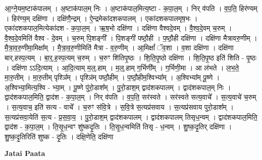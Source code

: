 \documentclass[17pt]{extarticle}
\begin{document}
आ॒ग्ने॒यम॒ष्टाक॑पालम् । अ॒ष्टाक॑पाल॒म् निः । अ॒ष्टाक॑पाल॒मित्य॒ष्टा - क॒पा॒ल॒म् । निर् व॑पति । व॒प॒ति॒ हिर॑ण्यम् । हिर॑ण्य॒म् दक्षि॑णा । दक्षि॑णै॒न्द्रम् । ऐ॒न्द्रमेका॑दशकपालम् । एका॑दशकपालमृष॒भः । एका॑दशकपाल॒मित्येका॑दश - क॒पा॒ल॒म् । ऋ॒ष॒भो दक्षि॑णा । दक्षि॑णा वैश्वदे॒वम् । वै॒श्व॒दे॒वम् च॒रुम् । वै॒श्व॒दे॒वमिति॑ वैश्व - दे॒वम् । च॒रुम् पि॒शङ्गी᳚ । पि॒शङ्गी॑ पष्ठौ॒ही । प॒ष्ठौ॒ही दक्षि॑णा । दक्षि॑णा मैत्रावरु॒णीम् । मै॒त्रा॒व॒रु॒णीमा॒मिक्षा᳚म् । मै॒त्रा॒व॒रु॒णीमिति॑ मैत्रा - व॒रु॒णीम् । आ॒मिक्षां᳚ ॅव॒शा । व॒शा दक्षि॑णा । दक्षि॑णा बार्.हस्प॒त्यम् । बा॒र्॒.ह॒स्प॒त्यम् च॒रुम् । च॒रुꣳ शि॑तिपृ॒ष्ठः । शि॒ति॒पृ॒ष्ठो दक्षि॑णा । शि॒ति॒पृ॒ष्ठ इति॑ शिति - पृ॒ष्ठः । दक्षि॑णा ऽऽदि॒त्याम् । आ॒दि॒त्याम् म॒ल्॒.हाम् । म॒ल्॒.हाम् ग॒र्भिणी᳚म् । ग॒र्भिणी॒मा । आ ल॑भते । ल॒भ॒ते॒ मा॒रु॒तीम् । मा॒रु॒तीम् पृश्ञि᳚म् । पृश्ञि॑म् पष्ठौ॒हीम् । प॒ष्ठौ॒हीम॒श्विभ्या᳚म् । अ॒श्विभ्या᳚म् पू॒ष्णे । अ॒श्विभ्या॒मित्य॒श्वि - भ्या॒म् । पू॒ष्णे पु॑रो॒डाश᳚म् । पु॒रो॒डाश॒म् द्वाद॑शकपालम् । द्वाद॑शकपाल॒म् निः । द्वाद॑शकपाल॒मिति॒ द्वाद॑श - क॒पा॒ल॒म् । निर् व॑पति । व॒प॒ति॒ सर॑स्वते । सर॑स्वते सत्य॒वाचे᳚ । स॒त्य॒वाचे॑ च॒रुम् । स॒त्य॒वाच॒ इति॑ सत्य - वाचे᳚ । च॒रुꣳ स॑वि॒त्रे । स॒वि॒त्रे स॒त्यप्र॑सवाय । स॒त्यप्र॑सवाय पुरो॒डाश᳚म् । स॒त्यप्र॑सवा॒येति॑ स॒त्य - प्र॒स॒वा॒य॒ । पु॒रो॒डाश॒म् द्वाद॑शकपालम् । द्वाद॑शकपालम् तिसृध॒न्वम् । द्वाद॑शकपाल॒मिति॒ द्वाद॑श - क॒पा॒ल॒म् । ति॒सृ॒ध॒न्वꣳ शु॑ष्कदृ॒तिः । ति॒सृ॒ध॒न्वमिति॑ तिसृ - ध॒न्वम् । शु॒ष्क॒दृ॒तिर् दक्षि॑णा । शु॒ष्क॒दृ॒तिरिति॑ शुष्क - दृ॒तिः । दक्षि॒णेति॒ दक्षि॑णा \newline

\textbf{Jatai Paata} \newline
\end{document}
